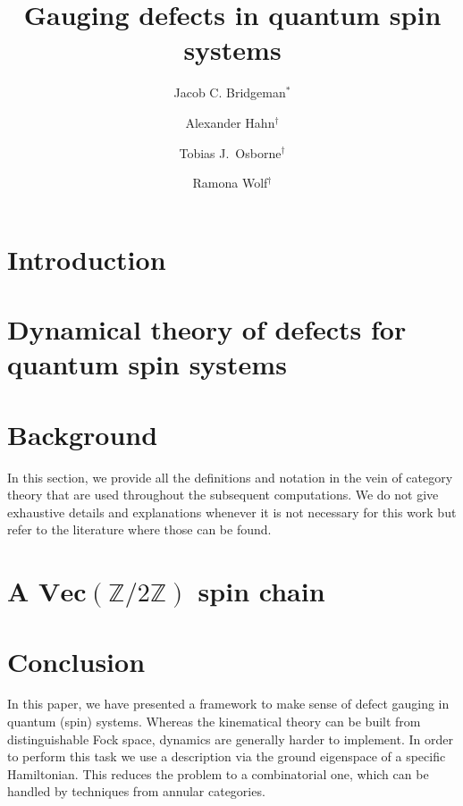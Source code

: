 \documentclass[a4paper,oneside]{amsart}
\title{Gauging defects in quantum spin systems}
\author{Jacob C. Bridgeman$^*$}
\author{Alexander Hahn$^\dagger$}
\author{Tobias J.\ Osborne$^\dagger$}
\author{Ramona Wolf$^\dagger$}
\renewcommand{\Vec}{\textbf{Vec}}
\newcommand{\Z}{\mathbb{Z}}
\theoremstyle{plain}%
\theoremstyle{definition}
\theoremstyle{remark}
\begin{document}
\begin{abstract}
	
\end{abstract}

\maketitle




\section{Introduction}


\section{Dynamical theory of defects for quantum spin systems}



\section{Background}\label{S:defs}
In this section, we provide all the definitions and notation in the vein of category theory that are used throughout the subsequent computations. We do not give exhaustive details and explanations whenever it is not necessary for this work but refer to the literature where those can be found.







\section{A $\Vec(\Z/2\Z)$ spin chain}




\section{Conclusion}
\label{Conclusion}
In this paper, we have presented a framework to make sense of defect gauging in quantum (spin) systems. Whereas the kinematical theory can be built from distinguishable Fock space, dynamics are generally harder to implement. In order to perform this task we use a description via the ground eigenspace of a specific Hamiltonian. This reduces the problem to a combinatorial one, which can be handled by techniques from annular categories.
\end{document}
